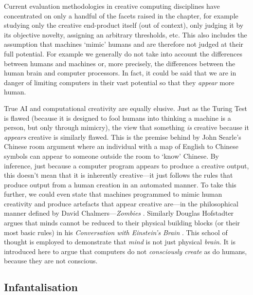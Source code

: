 Current evaluation methodologies in creative computing disciplines have concentrated on only a handful of the facets raised in the  chapter, for example studying only the creative end-product itself (out of context), only judging it by its objective novelty, assigning an arbitrary thresholds, etc. This also includes the assumption that machines `mimic' humans and are therefore not judged at their full potential. For example we generally do not take into account the differences between humans and machines or, more precisely, the differences between the human brain and computer processors. In fact, it could be said that we are in danger of limiting computers in their vast potential so that they \emph{appear} more human.

True \ac{AI} and computational creativity are equally elusive. Just as the Turing Test \autocite{Turing1950} is flawed (because it is designed to fool humans into thinking a machine is a person, but only through mimicry), the view that something \emph{is} creative because it \emph{appears} creative is similarly flawed. This is the premise behind by John Searle's Chinese room argument \autocite*{Searle1980} where an individual with a map of English to Chinese symbols can appear to someone outside the room to `know' Chinese. By inference, just because a computer program appears to produce a creative output, this doesn't mean that it is inherently creative---it just follows the rules that produce output from a human creation in an automated manner. To take this further, we could even state that machines programmed to mimic human creativity and produce artefacts that appear creative are---in the philosophical manner defined by David Chalmers---\emph{Zombies} \autocite*{Chalmers1996}. Similarly Douglas Hofstadter argues that minds cannot be reduced to their physical building blocks (or their most basic rules) in his \textit{Conversation with Einstein's Brain} \autocite*{Hofstadter1981}. This school of thought is employed to demonstrate that \emph{mind} is not just physical \emph{brain}. It is introduced here to argue that computers do not \emph{consciously create} as do humans, because they are not conscious.


\subsection{Infantalisation}
\label{s:babying}

